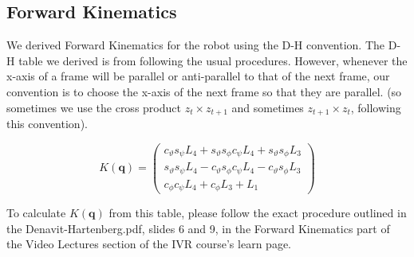 \documentclass[11pt, a4paper]{article}
\begin{document}
    \subsection{Forward Kinematics}
    We derived Forward Kinematics for the robot using the D-H convention. 
    The D-H table we derived is from following the usual procedures. However, whenever the x-axis of a frame will be parallel or anti-parallel to that of the next frame, our convention is to choose
    the x-axis of the next frame so that they are parallel. (so sometimes we use the cross product
    $z_t \times z_{t+1}$ and sometimes $z_{t+1} \times z_t$, following this convention).
\begin{multicols}{2}
    \begin{center}
    \end{center}
\columnbreak
    \vspace{2cm}
        $$
        K(\textbf{q}) = 
        \begin{pmatrix}
            c_{\vartheta}s_{\psi}L_4 + s_{\vartheta}s_{\phi}c_{\psi}L_4 + s_{\vartheta}s_{\phi}L_3\\
            s_{\vartheta}s_{\psi}L_4 - c_{\vartheta}s_{\phi}c_{\psi}L_4 - c_{\vartheta}s_{\phi}L_3\\
            c_{\phi}c_{\psi}L_4 + c_{\phi}L_3 + L_1
        \end{pmatrix}
        $$
\end{multicols}    
    
    To calculate $K(\textbf{q})$ from this table, please follow the exact procedure outlined in 
    the Denavit-Hartenberg.pdf, slides 6 and 9, in the Forward Kinematics part of the
    Video Lectures section of the IVR course's learn page.
\end{document}
